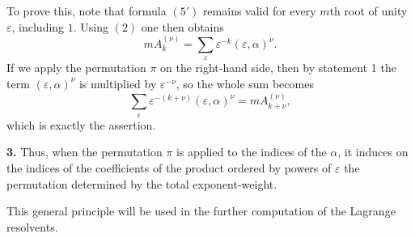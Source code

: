 \documentclass[11pt]{article}
\begin{document}
\medskip
To prove this, note that formula \((5')\) remains valid for every $m$th root of unity $\varepsilon$, including $1$. Using \((2)\) one then obtains
\[
mA^{(\nu)}_k=\sum_{\varepsilon}\varepsilon^{-k}(\varepsilon,\alpha)^\nu.
\tag{6}
\]
If we apply the permutation $\pi$ on the right-hand side, then by statement 1 the term $(\varepsilon,\alpha)^\nu$ is multiplied by $\varepsilon^{-\nu}$, so the whole sum becomes
\[
\sum_{\varepsilon}\varepsilon^{-(k+\nu)}(\varepsilon,\alpha)^\nu
=
mA^{(\nu)}_{k+\nu},
\]
which is exactly the assertion.

\medskip
\noindent\textbf{3.}
Thus, when the permutation $\pi$ is applied to the indices of the $\alpha$, it induces on the indices of the coefficients of the product ordered by powers of $\varepsilon$ the permutation determined by the total exponent-weight.

\medskip
This general principle will be used in the further computation of the Lagrange resolvents.

\medskip
\end{document}
